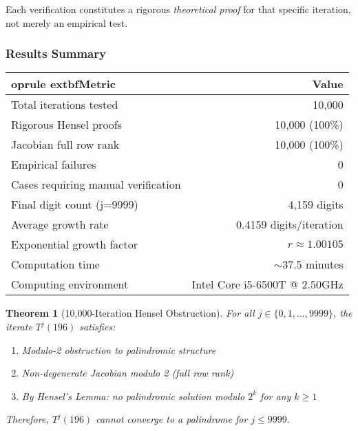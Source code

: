 \documentclass[12pt,a4paper]{article}
\newtheorem{theorem}{Theorem}[section]
\begin{document}
Each verification constitutes a rigorous \textit{theoretical proof} for 
that specific iteration, not merely an empirical test.

\subsubsection{Results Summary}

\begin{center}
\begin{tabular}{@{}l r@{}}
	oprule
	extbf{Metric} & \textbf{Value} \\
\midrule
Total iterations tested & 10,000 \\
Rigorous Hensel proofs & 10,000 (100\%) \\
Jacobian full row rank & 10,000 (100\%) \\
Empirical failures & 0 \\
Cases requiring manual verification & 0 \\
\midrule
Final digit count (j=9999) & 4,159 digits \\
Average growth rate & 0.4159 digits/iteration \\
Exponential growth factor & $r \approx 1.00105$ \\
\midrule
Computation time & $\sim$37.5 minutes \\
Computing environment & Intel Core i5-6500T @ 2.50GHz \\
\bottomrule
\end{tabular}
\end{center}

\begin{theorem}[10,000-Iteration Hensel Obstruction]\label{thm:196_trajectory_proven_10k}
For all $j \in \{0, 1, \ldots, 9999\}$, the iterate $T^j(196)$ satisfies:
\begin{enumerate}
\item Modulo-2 obstruction to palindromic structure
\item Non-degenerate Jacobian modulo 2 (full row rank)
\item By Hensel's Lemma: no palindromic solution modulo $2^k$ for any $k \geq 1$
\end{enumerate}
Therefore, $T^j(196)$ cannot converge to a palindrome for $j \leq 9999$.
\end{theorem}
\end{document}
